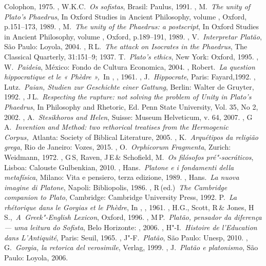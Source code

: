 \begin{bibliohedra}
  Colophon, 1975.
, W.K.C.~\emph{Os sofistas}, Brasil: Paulus, 1991.
, M.~\emph{The unity of Plato's Phaedrus}, In Oxford Studies in
  Ancient Philosophy, volume , Oxford, p.151--173, 1989.
, M.~\emph{The unity of the Phaedrus: a postscript}, In Oxford
  Studies in Ancient Philosophy, volume , Oxford, p.189--191, 1989.
, V.~\emph{Interpretar Platão}, São Paulo: Loyola, 2004.
, R\,L.~\emph{The attack on Isocrates in the Phaedrus}, The
  Classical Quarterly, 31:151--9; 1937.
 T.~\emph{Plato's ethics}, New York: Oxford, 1995.
, W.~\emph{Paideia}, México: Fondo de Cultura Economica, 2004.
, Robert.~\emph{La question hippocratique et le « Phèdre »,}~In
  , , 1961.
, J.~\emph{Hippocrate}, Paris: Fayard,1992.
, Lutz.~\emph{Paian, Studien zur Geschichte einer Gattung},
  Berlin: Walter de Gruyter, 1992.
, J\,L.~\emph{Respecting the rupture: not solving the problem
  of Unity in Plato's Phaedrus}, In Philosophy and Rhetoric, Ed. Penn
  State University, Vol. 35, No 2, 2002.
, A.~\emph{Stesikhoros and Helen}, Suisse: Museum Helveticum, v.
  64, 2007.
, G\,A.~\emph{Invention and Method: two rethorical treatises
  from the Hermogenic Corpus,}~Atlanta: Society of Biblical Literature,
  2005.
, K.~\emph{Arquétipos da religião grega}, Rio de Janeiro:
  Vozes, 2015.
, O.~\emph{Orphicorum Fragmenta}, Zurich: Weidmann, 1972.
, G\,S, Raven, J\,E\,\& Schofield, M.~\emph{Os filósofos
  pré"-socráticos}, Lisboa: Calouste Gulbenkian, 2010.
, Hans.~\emph{Platone e i fondamenti della metafísica}, Milano:
  Vita e pensiero, terza edizione, 1989.
, Hans.~\emph{La nuova imagine di Platone}, Napoli: Bibliopolis,
  1986.
, R\,(ed.)~\emph{The Cambridge companion to Plato}, Cambridge:
  Cambridge University Press, 1992.
 P.~\emph{La rhétorique dans le Gorgias et le Phèdre}, In
  , , 1961.
, H.G., Scott, R\,\& Jones, H\,S.,~\emph{A~Greek"-English
  Lexicon}, Oxford, 1996.
, M\,P.~\emph{Platão, pensador da diferença --- uma leitura do
  Sofista}, Belo Horizonte: , 2006.
, H"-I.~\emph{Histoire de l'Education dans L'Antiquité}, Paris:
  Seuil, 1965.
, J"-F.~\emph{Platão}, São Paulo: Unesp, 2010.
, G.~\emph{Gorgia, la retorica del verosimile}, Verlag, 1999.
, J.~\emph{Platão e platonismo}, São Paulo: Loyola, 2006.

\end{bibliohedra}
